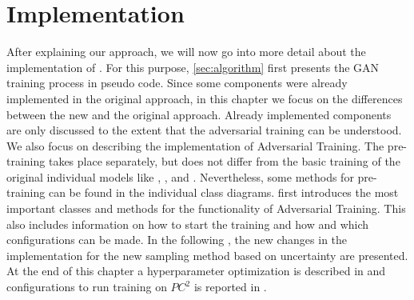 \chapter{Implementation}
\label{ch:implementation}


After explaining our approach, we will now go into more detail about the implementation of \usgan.
For this purpose, \autoref{sec:algorithm} first presents the \ac{GAN} training process in pseudo code.
Since some components were already implemented in the original \kbgan approach, in this chapter we focus on the differences between the new \ucgan and the original approach.
Already implemented components are only discussed to the extent that the adversarial training can be understood.
We also focus on describing the implementation of Adversarial Training.
The pre-training takes place separately, but does not differ from the basic training of the original individual models like \distmult, \complex, \transe and \transd.
Nevertheless, some methods for pre-training can be found in the individual class diagrams.
  first introduces the most important classes and methods for the functionality of Adversarial Training.
This also includes information on how to start the training and how and which configurations can be made.
In the following , the new changes in the implementation for the new sampling method based on uncertainty are presented.
At the end of this chapter a hyperparameter optimization is described in  and configurations to run training on $PC^2$ is reported in .





